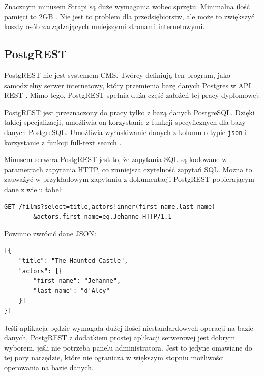 Znacznym minusem Strapi są duże wymagania wobec sprzętu. Minimalna ilość pamięci
to 2GB \cite{StrapiDeployment}. Nie jest to problem dla przedsiębiorstw, ale
może to zwiększyć koszty osób zarządzających mniejszymi stronami internetowymi.


\subsection{PostgREST}

PostgREST nie jest systemem CMS. Twórcy definiują ten program, jako samodzielny
serwer internetowy, który przemienia bazę danych Postgres w API REST
\cite{PostgrestDefinition}. Mimo tego, PostgREST spełnia dużą część założeń tej
pracy dyplomowej.

PostgREST jest przeznaczony do pracy tylko z bazą danych PostgreSQL. Dzięki
takiej specjalizacji, umożliwia on korzystanie z funkcji specyficznych dla bazy
danych PostgreSQL. Umożliwia wyłuskiwanie danych z kolumn o typie \texttt{json}
\cite{PostgrestJson} i korzystanie z funkcji full-text search \cite{PostgrestFts}.

Minusem serwera PostgREST jest to, że zapytania SQL są kodowane w parametrach
zapytania HTTP, co zmniejsza czytelność zapytań SQL. Można to zauważyć w
przykładowym zapytaniu z dokumentacji PostgREST pobierającym dane z wielu tabel:

\begin{verbatim}
GET /films?select=title,actors!inner(first_name,last_name)
        &actors.first_name=eq.Jehanne HTTP/1.1
\end{verbatim}

\noindent Powinno zwrócić dane JSON:

\begin{verbatim}
[{
    "title": "The Haunted Castle",
    "actors": [{
        "first_name": "Jehanne",
        "last_name": "d'Alcy"
    }]
}]
\end{verbatim}

Jeśli aplikacja będzie wymagała dużej ilości niestandardowych
operacji na bazie danych, PostgREST z dodatkiem prostej aplikacji serwerowej
jest dobrym wyborem, jeśli nie potrzeba panelu administratora. Jest to jedyne
omawiane do tej pory narzędzie, które nie ogranicza w większym stopniu
możliwości operowania na bazie danych.

